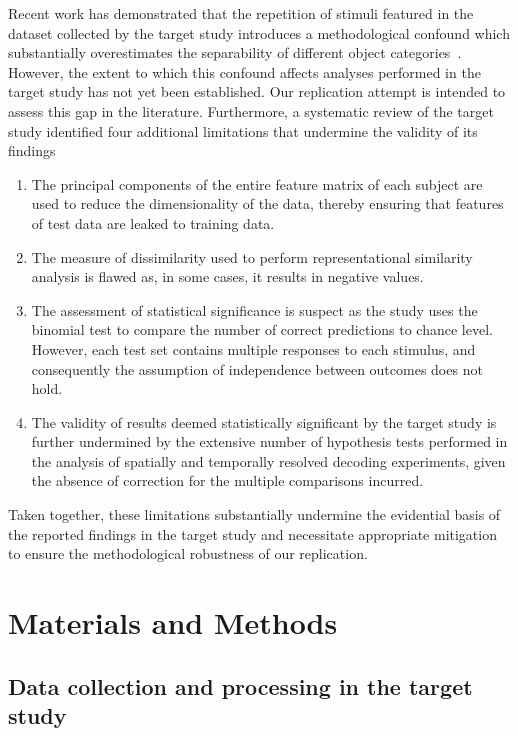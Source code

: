 Recent work has demonstrated that the repetition of stimuli featured in the dataset collected by the target study introduces a methodological confound which substantially overestimates the separability of different object categories~\cite{Kilgallen:2025}. However, the extent to which this confound affects analyses performed in the target study has not yet been established. Our replication attempt is intended to assess this gap in the literature. Furthermore, a systematic review of the target study identified four additional limitations that undermine the validity of its findings

\begin{enumerate}[label=\Roman*]
    \item \label{enum:pc-leakage} The principal components of the entire feature matrix of each subject are used to reduce the dimensionality of the data, thereby ensuring that features of test data are leaked to training data.
    \item \label{enum:flawed-measure} The measure of dissimilarity used to perform representational similarity analysis is flawed as, in some cases, it results in negative values.
    \item \label{enum:outcome-dependence} The assessment of statistical significance is suspect as the study uses the binomial test to compare the number of correct predictions to chance level. However, each test set contains multiple responses to each stimulus, and consequently the assumption of independence between outcomes does not hold.
    \item \label{enum:multiple-comparisons} The validity of results deemed statistically significant by the target study is further undermined by the extensive number of hypothesis tests performed in the analysis of spatially and temporally resolved decoding experiments, given the absence of correction for the multiple comparisons incurred.
\end{enumerate}

Taken together, these limitations substantially undermine the evidential basis of the reported findings in the target study and necessitate appropriate mitigation to ensure the methodological robustness of our replication. 

\section{Materials and Methods}
\subsection{Data collection and processing in the target study}

